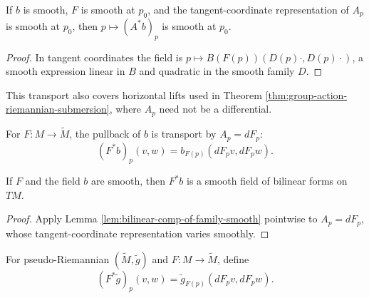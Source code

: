\begin{lemma}
\label{lem:bilinear-comp-of-family-smooth}
\leanok
{}
If $b$ is smooth, $F$ is smooth at $p_0$, and the tangent-coordinate representation of $A_p$ is smooth at $p_0$, then $p\mapsto(A^*b)_p$ is smooth at $p_0$.
\end{lemma}
\begin{proof}
\leanok
{}
\sketch In tangent coordinates the field is $p\mapsto B(F(p))(D(p)\cdot,D(p)\cdot)$, a smooth expression linear in $B$ and quadratic in the smooth family $D$.
\end{proof}

This transport also covers horizontal lifts used in Theorem \ref{thm:group-action-riemannian-submersion}, where $A_p$ need not be a differential.

\begin{definition}
\label{def:pullback-form-of-family}
\leanok
{}
For $F:M\to\widetilde M$, the pullback of $b$ is transport by $A_p=dF_p$:
\[
(F^*b)_p(v,w)=b_{F(p)}(dF_pv,dF_pw).
\]
\end{definition}

\begin{lemma}
\label{lem:pullback-form-of-family-smooth}
\leanok
{}
If $F$ and the field $b$ are smooth, then $F^*b$ is a smooth field of bilinear forms on $TM$.
\end{lemma}
\begin{proof}
\leanok
{}
\sketch Apply Lemma \ref{lem:bilinear-comp-of-family-smooth} pointwise to $A_p=dF_p$, whose tangent-coordinate representation varies smoothly.
\end{proof}

\begin{definition}
\label{def:pseudo-pullback-form}
\leanok
{}
For pseudo-Riemannian $(\widetilde M,\widetilde g)$ and $F:M\to\widetilde M$, define
\[
(F^*\widetilde g)_p(v,w)=\widetilde g_{F(p)}(dF_pv,dF_pw).
\]
\end{definition}

